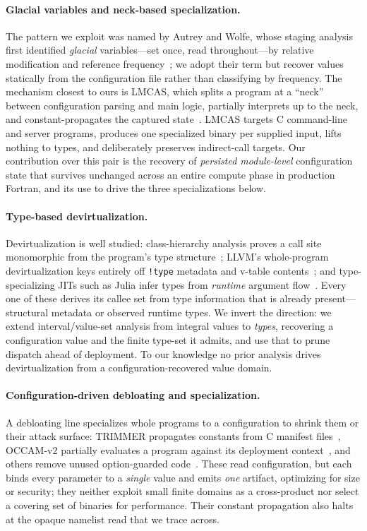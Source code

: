 \paragraph{Glacial variables and neck-based specialization.}
The pattern we exploit was named by Autrey and Wolfe, whose staging analysis first identified \emph{glacial} variables---set once, read throughout---by relative modification and reference frequency~\cite{glacial}; we adopt their term but recover values statically from the configuration file rather than classifying by frequency. The mechanism closest to ours is LMCAS, which splits a program at a ``neck'' between configuration parsing and main logic, partially interprets up to the neck, and constant-propagates the captured state~\cite{lmcas}. LMCAS targets C command-line and server programs, produces one specialized binary per supplied input, lifts nothing to types, and deliberately preserves indirect-call targets. Our contribution over this pair is the recovery of \emph{persisted module-level} configuration state that survives unchanged across an entire compute phase in production Fortran, and its use to drive the three specializations below.

\paragraph{Type-based devirtualization.}
Devirtualization is well studied: class-hierarchy analysis proves a call site monomorphic from the program's type structure~\cite{cha_dgc}; LLVM's whole-program devirtualization keys entirely off \texttt{!type} metadata and v-table contents~\cite{wholeprogramdevirt}; and type-specializing JITs such as Julia infer types from \emph{runtime} argument flow~\cite{julia}. Every one of these derives its callee set from type information that is already present---structural metadata or observed runtime types. We invert the direction: we extend interval/value-set analysis from integral values to \emph{types}, recovering a configuration value and the finite type-set it admits, and use that to prune dispatch ahead of deployment. To our knowledge no prior analysis drives devirtualization from a configuration-recovered value domain.

\paragraph{Configuration-driven debloating and specialization.}
A debloating line specializes whole programs to a configuration to shrink them or their attack surface: TRIMMER propagates constants from C manifest files~\cite{trimmer}, OCCAM-v2 partially evaluates a program against its deployment context~\cite{occamv2}, and others remove unused option-guarded code~\cite{eurosec_debloat,ternava_sac}. These read configuration, but each binds every parameter to a \emph{single} value and emits \emph{one} artifact, optimizing for size or security; they neither exploit small finite domains as a cross-product nor select a covering set of binaries for performance. Their constant propagation also halts at the opaque namelist read that we trace across.

